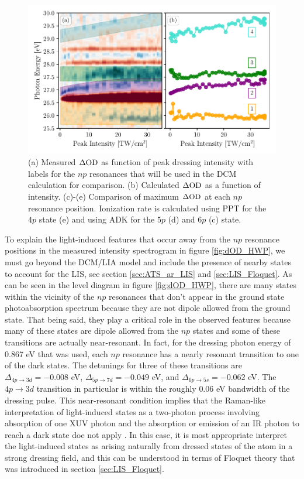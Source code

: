 \begin{figure}
	\centering
	\includegraphics[width=1.0\textwidth]{figures/ATS/LIS_energy.pdf}
	\caption[Light-induced state energies]{(a) Measured $\Delta\mathrm{OD}$ as function of peak dressing intensity with labels for the $np$ resonances that will be used in the DCM calculation for comparison. (b) Calculated $\Delta\mathrm{OD}$ as a function of intensity. (c)-(e) Comparison of maximum $\Delta\mathrm{OD}$ at each $np$ resonance position.  Ionization rate is calculated using PPT for the $4p$ state (e) and using ADK for the $5p$ (d) and $6p$ (c) state.}
	\label{fig:LIS_energies}
\end{figure}

To explain the light-induced features that occur away from the $np$ resonance positions in the measured intensity spectrogram in figure \ref{fig:dOD_HWP}, we must go beyond the DCM/LIA model and include the presence of nearby states to account for the LIS, see section \ref{sec:ATS_ar_LIS} and \ref{sec:LIS_Floquet}.  As can be seen in the level diagram in figure \ref{fig:dOD_HWP}, there are many states within the vicinity of the $np$ resonances that don't appear in the ground state photoabsorption spectrum because they are not dipole allowed from the ground state.  That being said, they play a critical role in the observed features because many of these states are dipole allowed from the $np$ states and some of these transitions are actually near-resonant.  In fact, for the dressing photon energy of 0.867 eV that was used, each $np$ resonance has a nearly resonant transition to one of the dark states. The detunings for three of these transitions are $\Delta_{4p\rightarrow3d}=-0.008$ eV, $\Delta_{5p\rightarrow7d}=-0.049$ eV, and $\Delta_{6p\rightarrow5s}=-0.062$ eV.  The $4p\rightarrow3d$ transition in particular is within the roughly $0.06$ eV bandwidth of the dressing pulse.  This near-resonant condition implies that the Raman-like interpretation of light-induced states as a two-photon process involving  absorption of one XUV photon and the absorption or emission of an IR photon to reach a dark state doe not apply \cite{chenLightinducedStatesAttosecond2012, wuTheoryStrongfieldAttosecond2016}.  In this case, it is most appropriate interpret the light-induced states as arising naturally from dressed states of the atom in a strong dressing field, and this can be understood in terms of Floquet theory that was introduced in section \ref{sec:LIS_Floquet}. 

